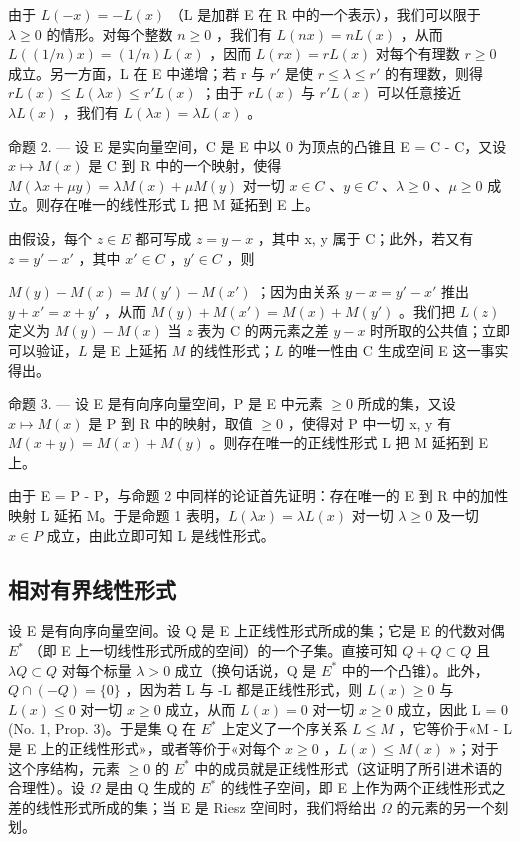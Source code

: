 由于 \(L(-x) = -L(x)\) （L 是加群 E 在 R 中的一个表示），我们可以限于 \(\lambda \geqslant 0\) 的情形。对每个整数 \(n \geqslant 0\) ，我们有 \(L(nx) = nL(x)\) ，从而 \(L((1/n)x) = (1/n)L(x)\) ，因而 \(L(rx) = rL(x)\) 对每个有理数 \(r \geqslant 0\) 成立。另一方面，L 在 E 中递增；若 r 与 \(r'\) 是使 \(r \leqslant \lambda \leqslant r'\) 的有理数，则得 \(rL(x) \leqslant L(\lambda x) \leqslant r'L(x)\) ；由于 \(rL(x)\) 与 \(r'L(x)\) 可以任意接近 \(\lambda L(x)\) ，我们有 \(L(\lambda x) = \lambda L(x)\) 。

命题 2. --- 设 E 是实向量空间，C 是 E 中以 0 为顶点的凸锥且 E = C - C，又设 \(x \mapsto M(x)\) 是 C 到 R 中的一个映射，使得 \(M(\lambda x + \mu y) = \lambda M(x) + \mu M(y)\) 对一切 \(x \in C\) 、\(y \in C\) 、\(\lambda \geqslant 0\) 、\(\mu \geqslant 0\) 成立。则存在唯一的线性形式 L 把 M 延拓到 E 上。

由假设，每个 \(z \in E\) 都可写成 \(z = y - x\) ，其中 x, y 属于 C；此外，若又有 \(z = y' - x'\) ，其中 \(x' \in C\) ，\(y' \in C\) ，则

\(M(y) - M(x) = M(y') - M(x')\) ；因为由关系 \(y - x = y' - x'\) 推出 \(y + x' = x + y'\) ，从而 \(M(y) + M(x') = M(x) + M(y')\) 。我们把 \(L(z)\) 定义为 \(M(y) - M(x)\) 当 \(z\) 表为 C 的两元素之差 \(y - x\) 时所取的公共值；立即可以验证，\(L\) 是 E 上延拓 \(M\) 的线性形式；\(L\) 的唯一性由 C 生成空间 E 这一事实得出。

命题 3. --- 设 E 是有向序向量空间，P 是 E 中元素 \(\geqslant 0\) 所成的集，又设 \(x \mapsto M(x)\) 是 P 到 R 中的映射，取值 \(\geqslant 0\) ，使得对 P 中一切 x, y 有 \(M(x + y) = M(x) + M(y)\) 。则存在唯一的正线性形式 L 把 M 延拓到 E 上。

由于 E = P - P，与命题 2 中同样的论证首先证明：存在唯一的 E 到 R 中的加性映射 L 延拓 M。于是命题 1 表明，\(L(\lambda x) = \lambda L(x)\) 对一切 \(\lambda \geqslant 0\) 及一切 \(x \in P\) 成立，由此立即可知 L 是线性形式。

\subsection{相对有界线性形式}

设 E 是有向序向量空间。设 Q 是 E 上正线性形式所成的集；它是 E 的代数对偶 \(E^{*}\) （即 E 上一切线性形式所成的空间）的一个子集。直接可知 \(Q + Q \subset Q\) 且 \(\lambda Q \subset Q\) 对每个标量 \(\lambda > 0\) 成立（换句话说，Q 是 \(E^{*}\) 中的一个凸锥）。此外，\(Q \cap (-Q) = \{0\}\) ，因为若 L 与 -L 都是正线性形式，则 \(L(x) \geqslant 0\) 与 \(L(x) \leqslant 0\) 对一切 \(x \geqslant 0\) 成立，从而 \(L(x) = 0\) 对一切 \(x \geqslant 0\) 成立，因此 L = 0 (No. 1, Prop. 3)。于是集 Q 在 \(E^{*}\) 上定义了一个序关系 \(L \leqslant M\) ，它等价于«M - L 是 E 上的正线性形式»，或者等价于«对每个 \(x \geqslant 0\) ，\(L(x) \leqslant M(x)\) »；对于这个序结构，元素 \(\geqslant 0\) 的 \(E^{*}\) 中的成员就是正线性形式（这证明了所引进术语的合理性）。设 \(\Omega\) 是由 Q 生成的 \(E^{*}\) 的线性子空间，即 E 上作为两个正线性形式之差的线性形式所成的集；当 E 是 Riesz 空间时，我们将给出 \(\Omega\) 的元素的另一个刻划。

